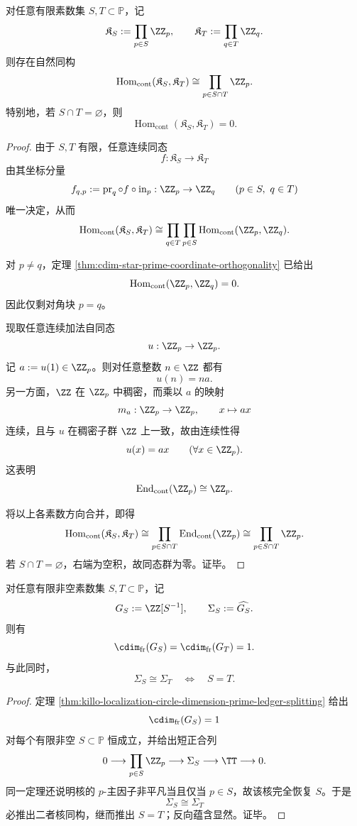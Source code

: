 \begin{theorem}\label{thm:xi-time-part9zl-localized-solenoid-prime-orthogonality}
对任意有限素数集 \(S,T\subset\mathbb P\)，记
\[
\mathfrak K_S:=\prod_{p\in S}\ZZ_p,
\qquad
\mathfrak K_T:=\prod_{q\in T}\ZZ_q.
\]
则存在自然同构
\[
\operatorname{Hom}_{\mathrm{cont}}(\mathfrak K_S,\mathfrak K_T)
\cong
\prod_{p\in S\cap T}\ZZ_p.
\]
特别地，若 \(S\cap T=\varnothing\)，则
\[
\operatorname{Hom}_{\mathrm{cont}}(\mathfrak K_S,\mathfrak K_T)=0.
\]
\end{theorem}
\begin{proof}
由于 \(S,T\) 有限，任意连续同态
\[
f:\mathfrak K_S\to\mathfrak K_T
\]
由其坐标分量
\[
f_{q,p}:=\operatorname{pr}_q\circ f\circ \operatorname{in}_p:\ZZ_p\to\ZZ_q
\qquad(p\in S,\ q\in T)
\]
唯一决定，从而
\[
\operatorname{Hom}_{\mathrm{cont}}(\mathfrak K_S,\mathfrak K_T)
\cong
\prod_{q\in T}\prod_{p\in S}
\operatorname{Hom}_{\mathrm{cont}}(\ZZ_p,\ZZ_q).
\]

对 \(p\neq q\)，定理 \ref{thm:cdim-star-prime-coordinate-orthogonality} 已给出
\[
\operatorname{Hom}_{\mathrm{cont}}(\ZZ_p,\ZZ_q)=0.
\]
因此仅剩对角块 \(p=q\)。

现取任意连续加法自同态
\[
u:\ZZ_p\to\ZZ_p.
\]
记 \(a:=u(1)\in\ZZ_p\)。则对任意整数 \(n\in\ZZ\) 都有
\[
u(n)=na.
\]
另一方面，\(\ZZ\) 在 \(\ZZ_p\) 中稠密，而乘以 \(a\) 的映射
\[
m_a:\ZZ_p\to\ZZ_p,\qquad x\mapsto ax
\]
连续，且与 \(u\) 在稠密子群 \(\ZZ\) 上一致，故由连续性得
\[
u(x)=ax
\qquad(\forall x\in\ZZ_p).
\]
这表明
\[
\operatorname{End}_{\mathrm{cont}}(\ZZ_p)\cong \ZZ_p.
\]

将以上各素数方向合并，即得
\[
\operatorname{Hom}_{\mathrm{cont}}(\mathfrak K_S,\mathfrak K_T)
\cong
\prod_{p\in S\cap T}\operatorname{End}_{\mathrm{cont}}(\ZZ_p)
\cong
\prod_{p\in S\cap T}\ZZ_p.
\]
若 \(S\cap T=\varnothing\)，右端为空积，故同态群为零。证毕。
\end{proof}

\begin{corollary}[有限局部化的圆维塌缩与支撑刚性]\label{cor:xi-time-part9zl-localization-circle-collapse-support-rigidity}
对任意有限非空素数集 \(S,T\subset\mathbb P\)，记
\[
G_S:=\ZZ[S^{-1}],
\qquad
\Sigma_S:=\widehat{G_S}.
\]
则有
\[
\cdim_{\mathrm{fr}}(G_S)=\cdim_{\mathrm{fr}}(G_T)=1.
\]
与此同时，
\[
\Sigma_S\cong \Sigma_T
\quad\Longleftrightarrow\quad
S=T.
\]
\end{corollary}
\begin{proof}
定理 \ref{thm:killo-localization-circle-dimension-prime-ledger-splitting} 给出
\[
\cdim_{\mathrm{fr}}(G_S)=1
\]
对每个有限非空 \(S\subset\mathbb P\) 恒成立，并给出短正合列
\[
0\longrightarrow \prod_{p\in S}\ZZ_p
\longrightarrow \Sigma_S
\longrightarrow \TT
\longrightarrow 0.
\]
同一定理还说明核的 \(p\)-主因子非平凡当且仅当 \(p\in S\)，故该核完全恢复 \(S\)。于是
\[
\Sigma_S\cong \Sigma_T
\]
必推出二者核同构，继而推出 \(S=T\)；反向蕴含显然。证毕。
\end{proof}

